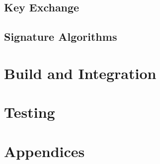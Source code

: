 \documentclass[11pt,a4paper]{report}
\theoremstyle{definitionstyle}
\begin{document}
\section{Key Exchange}

\section{Signature Algorithms}

\chapter{Build and Integration}

\chapter{Testing}


\newpage
\appendix
\chapter*{Appendices}
\end{document}
